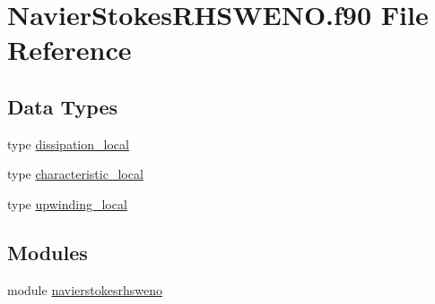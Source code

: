 \hypertarget{NavierStokesRHSWENO_8f90}{}\section{Navier\+Stokes\+R\+H\+S\+W\+E\+N\+O.\+f90 File Reference}
\label{NavierStokesRHSWENO_8f90}
\subsection*{Data Types}
\begin{DoxyCompactItemize}
\item 
type \hyperlink{structnavierstokesrhsweno_1_1dissipation__local}{dissipation\+\_\+local}
\item 
type \hyperlink{structnavierstokesrhsweno_1_1characteristic__local}{characteristic\+\_\+local}
\item 
type \hyperlink{structnavierstokesrhsweno_1_1upwinding__local}{upwinding\+\_\+local}
\end{DoxyCompactItemize}
\subsection*{Modules}
\begin{DoxyCompactItemize}
\item 
module \hyperlink{namespacenavierstokesrhsweno}{navierstokesrhsweno}
\end{DoxyCompactItemize}
